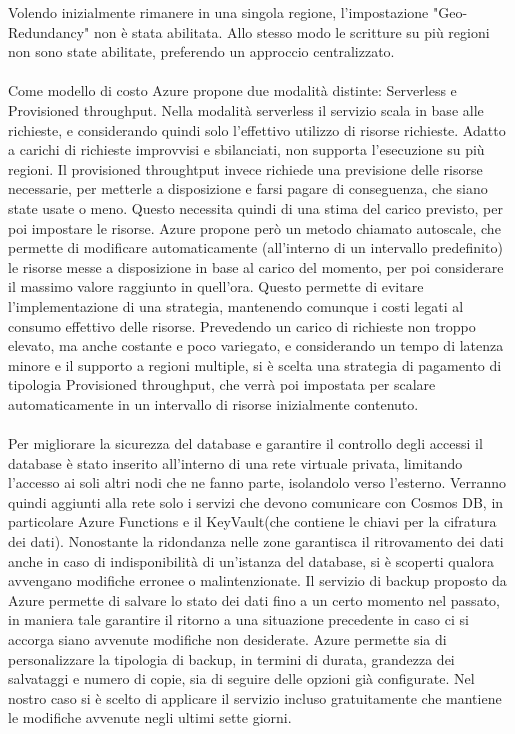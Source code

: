 Volendo inizialmente rimanere in una singola regione,
l'impostazione "Geo-Redundancy" non è stata abilitata.
Allo stesso modo le scritture su più regioni non sono state abilitate,
preferendo un approccio centralizzato.\\
\\
Come modello di costo Azure propone due modalità distinte: Serverless e Provisioned throughput.
Nella modalità serverless il servizio scala in base alle richieste,
e considerando quindi solo l'effettivo utilizzo di risorse richieste.
Adatto a carichi di richieste improvvisi e sbilanciati,
non supporta l'esecuzione su più regioni.
Il provisioned throughtput invece richiede una previsione delle risorse necessarie,
per metterle a disposizione e farsi pagare di conseguenza, che siano state usate o meno.
Questo necessita quindi di una stima del carico previsto,
per poi impostare le risorse.
Azure propone però un metodo chiamato autoscale, 
che permette di modificare automaticamente (all'interno di un intervallo predefinito)
le risorse messe a disposizione in base al carico del momento,
per poi considerare il massimo valore raggiunto in quell'ora.
Questo permette di evitare l'implementazione di una strategia,
mantenendo comunque i costi legati al consumo effettivo delle risorse.
Prevedendo un carico di richieste non troppo elevato,
ma anche costante e poco variegato, 
e considerando un tempo di latenza minore e il supporto a regioni multiple,
si è scelta una strategia di pagamento di tipologia Provisioned throughput,
che verrà poi impostata per scalare automaticamente in un intervallo di risorse inizialmente contenuto.\\
\\
Per migliorare la sicurezza del database e garantire il controllo degli accessi
il database è stato inserito all'interno di una rete virtuale privata,
limitando l'accesso ai soli altri nodi che ne fanno parte,
isolandolo verso l'esterno.
Verranno quindi aggiunti alla rete solo i servizi che devono comunicare con Cosmos DB,
in particolare Azure Functions e il KeyVault(che contiene le chiavi per la cifratura dei dati).
Nonostante la ridondanza nelle zone garantisca il ritrovamento dei dati 
anche in caso di indisponibilità di un'istanza del database,
si è scoperti qualora avvengano modifiche erronee o malintenzionate.
Il servizio di backup proposto da Azure permette di salvare lo stato dei dati 
fino a un certo momento nel passato, 
in maniera tale garantire il ritorno a una situazione precedente 
in caso ci si accorga siano avvenute modifiche non desiderate. 
Azure permette sia di personalizzare la tipologia di backup,
in termini di durata, grandezza dei salvataggi e numero di copie,
sia di seguire delle opzioni già configurate.
Nel nostro caso si è scelto di applicare il servizio incluso gratuitamente
che mantiene le modifiche avvenute negli ultimi sette giorni.\\


